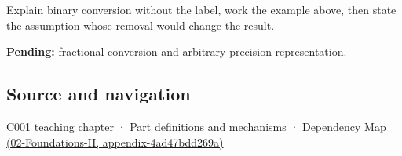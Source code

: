 Explain binary conversion without the label, work the example above, then state the assumption whose removal would change the result.

\textbf{Pending:} fractional conversion and arbitrary-precision representation.

\subsection{Source and navigation}\label{appendix-dc552784a2c0-source-and-navigation}

\hyperref[01-foundations-i-ch001-from-a-signal-to-an-interpretation]{C001 teaching chapter} · \hyperref[appendix-fd090d982a15]{Part definitions and mechanisms} · \href{../02-Foundations-II/main.pdf\#nameddest=appendix-4ad47bdd269a}{Dependency Map (02-Foundations-II, appendix-4ad47bdd269a)}
